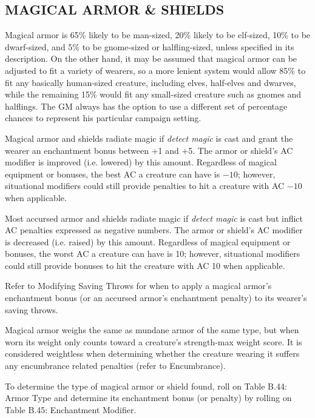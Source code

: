 \begin{multicols}{2}
\section{MAGICAL ARMOR \& SHIELDS}

Magical armor is 65\% likely to be man-sized, 20\% likely to be elf-sized, 10\% to be dwarf-sized, and 5\% to be gnome-sized or halfling-sized, unless specified in its description.  On the other hand, it may be assumed that magical armor can be adjusted to fit a variety of wearers, so a more lenient system would allow 85\% to fit any basically human-sized creature, including elves, half-elves and dwarves, while the remaining 15\% would fit any small-sized creature such as gnomes and halflings. The GM always has the option to use a different set of percentage chances to represent his particular campaign setting. 

Magical armor and shields radiate magic if \textit{detect magic} is cast and grant the wearer an enchantment bonus between +1 and +5.  The armor or shield's AC modifier is improved (i.e. lowered) by this amount.  Regardless of magical equipment or bonuses, the best AC a creature can have is $-10$; however, situational modifiers could still provide penalties to hit a creature with AC $-10$ when applicable.  

Most accursed armor and shields radiate magic if \textit{detect magic} is cast but inflict AC penalties expressed as negative numbers. The armor or shield's AC modifier is decreased (i.e. raised) by this amount.  Regardless of magical equipment or bonuses, the worst AC a creature can have is 10; however, situational modifiers could still provide bonuses to hit the creature with AC 10 when applicable.  

Refer to Modifying Saving Throws for when to apply a magical armor's enchantment bonus (or an accursed armor's enchantment penalty) to its wearer's saving throws.

Magical armor weighs the same as mundane armor of the same type, but when worn its weight only counts toward a creature's strength-max weight score.  It is considered weightless when determining whether the creature wearing it suffers any encumbrance related penalties (refer to Encumbrance).  

To determine the type of magical armor or shield found, roll on Table B.44: Armor Type and determine its enchantment bonus (or penalty) by rolling on Table B.45: Enchantment Modifier.  


\end{multicols}
